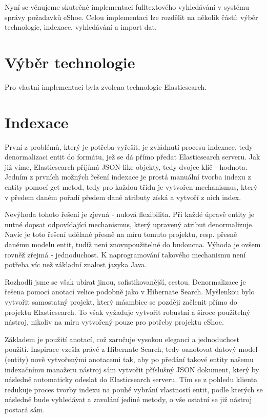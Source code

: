 \documentclass[11pt,draft,oneside]{fithesis2}
\begin{document}
Nyní se věnujeme skutečné implementaci fulltextového vyhledávání v systému správy požadavků eShoe. Celou implementaci lze rozdělit na několik částí: výběr technologie, indexace, vyhledávání a import dat.

\section{Výběr technologie}
Pro vlastní implementaci byla zvolena technologie Elasticsearch. 

\section{Indexace}
První z problémů, který je potřeba vyřešit, je zvládnutí procesu indexace, tedy denormalizaci entit do formátu, jež se dá přímo předat Elasticsearch serveru. Jak již víme, Elasticsearch příjímá JSON-like objekty,
tedy dvojce klíč - hodnota.
Jedním z prvních možných řešení indexace je prostá manuální tvorba indexu z entity pomocí get metod, tedy pro každou třídu je vytvořen mechanismus, který v předem daném pořadí předem dané atributy získá a vytvoří z nich index.

Nevýhoda tohoto řešení je zjevná - nulová flexibilita. Při každé úpravě entity je nutné dopsat odpovídající mechanismus, který upravený atribut denormalizuje. Navíc je toto řešení udělané přesně na míru tomuto projektu, resp. přesně danému modelu entit,
tudíž není znovupoužitelné do budoucna. Výhoda je ovšem rovněž zřejmá - jednoduchost. K naprogramování takového mechanismu není potřeba víc než základní znalost jazyka Java.

Rozhodli jsme se však ubírat jinou, sofistikovanější, cestou. Denormalizace je řešena pomocí anotací velice podobně jako v Hibernate Search. Myšlenkou bylo vytvořit samostatný projekt, který máambice se později začlenit přímo do projektu
Elasticsearch. To však vyžaduje vytvořit robustní a široce použitelný nástroj, nikoliv na míru vytvořený pouze pro potřeby projektu eShoe. 

Základem je použití anotací, což zaručuje vysokou eleganci a jednoduchost použití. Inspirace vzešla právě z Hibernate Search, tedy oanotovat datový model (entity) nově vytvořenými anotacemi tak, aby po předání takové entity našemu indexačnímu manažeru
nástroj sám vytvořit příslušný JSON dokument, který by následně automaticky odeslat do Elasticsearch serveru. Tím se z pohledu klienta redukuje proces tvorby indexu na pouhé vybrání vlastností entit, podle kterých se následně bude vyhledávat a
zavolání jediné metody, o vše ostatní se již nástroj postará sám.
\end{document}
